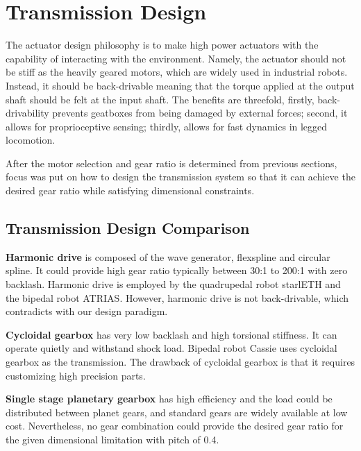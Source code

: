 \section{Transmission Design}
\label{sec:transmissionDesign}

The actuator design philosophy is to make high power actuators with the capability of interacting with the environment. Namely, the actuator should not be stiff as the heavily geared motors, which are widely used in industrial robots. Instead, it should be back-drivable meaning that the torque applied at the output shaft should be felt at the input shaft. The benefits are threefold, firstly, back-drivability prevents geatboxes from being damaged by external forces; second, it allows for proprioceptive sensing\cite{Seok2012}; thirdly, allows for fast dynamics in legged locomotion.

After the motor selection and gear ratio is determined from previous sections, focus was put on how to design the transmission system so that it can achieve the desired gear ratio while satisfying dimensional constraints.

\subsection{Transmission Design Comparison}
\label{sec:transmissionComparison}

\textbf{Harmonic drive} is composed of the wave generator, flexspline and circular spline. It could provide high gear ratio typically between 30:1 to 200:1 with zero backlash. Harmonic drive is employed by the quadrupedal robot starlETH\cite{Hutter2013} and the bipedal robot ATRIAS\cite{Hubicki2016}. However, harmonic drive is not back-drivable, which contradicts with our design paradigm.

\textbf{Cycloidal gearbox} has very low backlash and high torsional stiffness. It can operate quietly and withstand shock load. Bipedal robot Cassie uses cycloidal gearbox as the transmission. The drawback of cycloidal gearbox is that it requires customizing high precision parts.

\textbf{Single stage planetary gearbox} has high efficiency and the load could be distributed between planet gears, and standard gears are widely available at low cost. Nevertheless, no gear combination could provide the desired gear ratio for the given dimensional limitation with pitch of 0.4.

